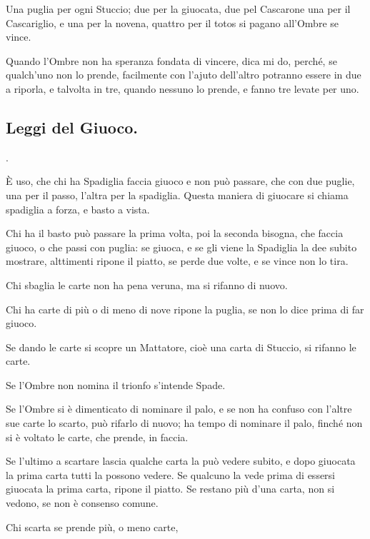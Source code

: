 \documentclass[11pt,a6paper]{article}
\newcounter{listombrecnt}
\begin{document}
Una puglia per ogni Stuccio; due per la
giuocata, due pel Cascarone una per il
Cascariglio, e una per la novena, quattro per il
totos si pagano all'Ombre se vince.

Quando l'Ombre non ha speranza fondata
di vincere, dica mi do, perché, se qualch'uno
non lo prende, facilmente con l'ajuto
dell'altro potranno essere in due a riporla, e
talvolta in tre, quando nessuno lo prende, e
fanno tre levate per uno.

\subsection{Leggi del Giuoco.}
\begin{list}
{.}
{
\setlength{\labelwidth}{1.5pt}
\setlength{\labelsep}{1.0em}
\setlength{\itemsep}{-0.3em}
\setlength{\leftmargin}{0em}
\setlength{\itemindent}{2.5em} %
}
\item È uso, che chi ha Spadiglia faccia giuoco
e non può passare, che con due
puglie, una per il passo, l'altra per la spadiglia.
Questa maniera di giuocare si chiama
spadiglia a forza, e basto a vista.
\item Chi ha il basto può passare la prima
volta, poi la seconda bisogna, che faccia
giuoco, o che passi con puglia: se giuoca, e
se gli viene la Spadiglia la dee subito mostrare,
alttimenti ripone il piatto, se perde
due volte, e se vince non lo tira.
\item Chi sbaglia le carte non ha pena veruna, ma si rifanno di nuovo.
\item Chi ha carte di più o di meno di nove
ripone la puglia, se non lo dice prima di far
giuoco.
\item Se dando le carte si scopre un Mattatore,
 cioè una carta di Stuccio, si rifanno le carte.
\item Se l'Ombre non nomina il trionfo s'intende Spade.
\item Se l'Ombre si è dimenticato di nominare
 il palo, e se non ha confuso con l'altre
sue carte lo scarto, può rifarlo di nuovo; ha
tempo di nominare il palo, finché non si è
voltato le carte, che prende, in faccia.
\item Se l'ultimo a scartare lascia qualche
carta la può vedere subito, e dopo giuocata
la prima carta tutti la possono vedere. Se
qualcuno la vede prima di essersi giuocata la
prima carta, ripone il piatto. Se restano più
d'una carta, non si vedono, se non è consenso comune.
\item Chi scarta se prende più, o meno carte,

\end{list}
\end{document}
